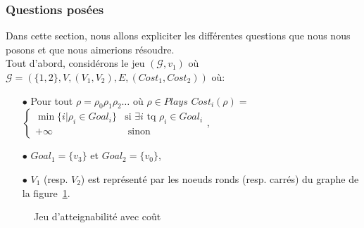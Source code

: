 
\subsubsection{Questions posées}
\label{section:questionsPosees}

Dans cette section, nous allons expliciter les différentes questions que nous nous posons et que nous aimerions résoudre.\\


Tout d'abord, considérons le jeu $(\mathcal{G},v_{1})$ où $\mathcal{G} = ( \{ 1,2 \}, V, (V_{1}, V_{2}),E, (Cost _{1},Cost _{2}))$ où: \begin{enumerate}
\item[$\bullet$] Pour tout  $\rho = \rho _{0} \rho _{1} \rho _{2} \ldots $ où $\rho \in Plays$ $Cost_{i}(\rho) = $ $\begin{cases} 
								\min \{ i | \rho _{i} \in Goal_{i} \} & \text{si } \exists i \text{ tq } \rho _{i} \in Goal_{i} \\
								+\infty & \text{ sinon}
								\end{cases}$,
\item[$\bullet$] $Goal_{1} = \{ v_{3} \}$ et $Goal_{2} = \{ v_{0} \}$,
\item[$\bullet$]  $V_{1}$ (resp. $V_{2}$) est représenté par les noeuds ronds (resp. carrés) du graphe de la figure~\ref{ex:patologique}.

\end{enumerate}


\begin{figure}[ht!]
	\centering

	
	\caption{Jeu d'atteignabilité avec coût}
	\label{ex:patologique}
	

\end{figure}

